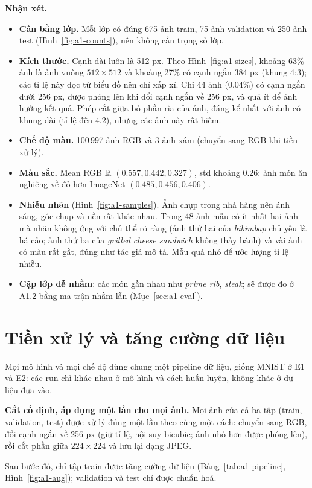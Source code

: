 \documentclass[11pt,a4paper]{article}
\begin{document}
\textbf{Nhận xét.}
\begin{itemize}
\item \textbf{Cân bằng lớp.} Mỗi lớp có đúng 675 ảnh train, 75 ảnh validation và 250 ảnh test (Hình~\ref{fig:a1-counts}), nên không cần trọng số lớp.
\item \textbf{Kích thước.} Cạnh dài luôn là 512 px. Theo Hình~\ref{fig:a1-sizes}, khoảng 63\% ảnh là ảnh vuông \(512\times512\) và khoảng 27\% có cạnh ngắn 384 px (khung 4:3); các tỉ lệ này đọc từ biểu đồ nên chỉ xấp xỉ. Chỉ 44 ảnh (0.04\%) có cạnh ngắn dưới 256 px, được phóng lên khi đổi cạnh ngắn về 256 px, và quá ít để ảnh hưởng kết quả. Phép cắt giữa bỏ phần rìa của ảnh, đáng kể nhất với ảnh có khung dài (tỉ lệ đến 4.2), nhưng các ảnh này rất hiếm.
\item \textbf{Chế độ màu.} 100\,997 ảnh RGB và 3 ảnh xám (chuyển sang RGB khi tiền xử lý).
\item \textbf{Màu sắc.} Mean RGB là \((0.557, 0.442, 0.327)\), std khoảng 0.26: ảnh món ăn nghiêng về đỏ hơn ImageNet \((0.485, 0.456, 0.406)\).
\item \textbf{Nhiễu nhãn} (Hình~\ref{fig:a1-samples}). Ảnh chụp trong nhà hàng nên ánh sáng, góc chụp và nền rất khác nhau. Trong 48 ảnh mẫu có ít nhất hai ảnh mà nhãn không ứng với chủ thể rõ ràng (ảnh thứ hai của \emph{bibimbap} chủ yếu là há cảo; ảnh thứ ba của \emph{grilled cheese sandwich} không thấy bánh) và vài ảnh có màu rất gắt, đúng như tác giả mô tả. Mẫu quá nhỏ để ước lượng tỉ lệ nhiễu.
\item \textbf{Cặp lớp dễ nhầm}: các món gần nhau như \emph{prime rib}, \emph{steak}; sẽ được đo ở A1.2 bằng ma trận nhầm lẫn (Mục~\ref{sec:a1-eval}).
\end{itemize}

\section{Tiền xử lý và tăng cường dữ liệu}\label{sec:a1-preproc}
Mọi mô hình và mọi chế độ dùng chung một pipeline dữ liệu, giống MNIST ở E1 và E2: các run chỉ khác nhau ở mô hình và cách huấn luyện, không khác ở dữ liệu đưa vào.

\textbf{Cắt cố định, áp dụng một lần cho mọi ảnh.} Mọi ảnh của cả ba tập (train, validation, test) được xử lý đúng một lần theo cùng một cách: chuyển sang RGB, đổi cạnh ngắn về 256 px (giữ tỉ lệ, nội suy bicubic; ảnh nhỏ hơn được phóng lên), rồi cắt phần giữa \(224\times224\) và lưu lại dạng JPEG.

Sau bước đó, chỉ tập train được tăng cường dữ liệu (Bảng~\ref{tab:a1-pipeline}, Hình~\ref{fig:a1-aug}); validation và test chỉ được chuẩn hoá.
\end{document}
